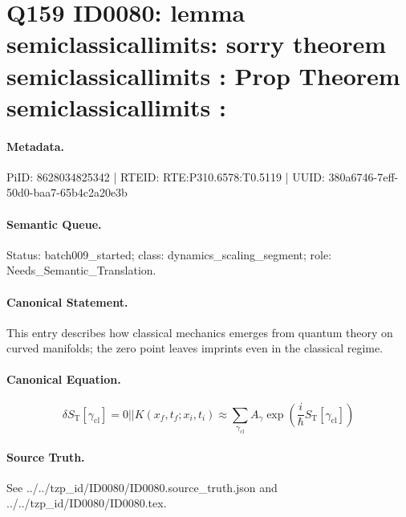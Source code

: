 \section*{Q159 ID0080: lemma semiclassicallimits: sorry theorem semiclassicallimits : Prop Theorem semiclassicallimits :}
\paragraph{Metadata.}
PiID: 8628034825342 | RTEID: RTE:P310.6578:T0.5119 | UUID: 380a6746-7eff-50d0-baa7-65b4c2a20e3b

\paragraph{Semantic Queue.}
Status: batch009\_started; class: dynamics\_scaling\_segment; role: Needs\_Semantic\_Translation.

\paragraph{Canonical Statement.}
This entry describes how classical mechanics emerges from quantum theory on curved manifolds; the zero point leaves imprints even in the classical regime.

\paragraph{Canonical Equation.}
\[
\delta S_{\mathrm{T}}[\gamma_{\mathrm{cl}}] = 0 || K(x_f,t_f;x_i,t_i) \approx \sum_{\gamma_{\mathrm{cl}}} A_{\gamma} \exp\!\left(\frac{i}{\hbar}S_{\mathrm{T}}[\gamma_{\mathrm{cl}}]\right)
\]

\paragraph{Source Truth.}
See ../../tzp\_id/ID0080/ID0080.source\_truth.json and ../../tzp\_id/ID0080/ID0080.tex.
